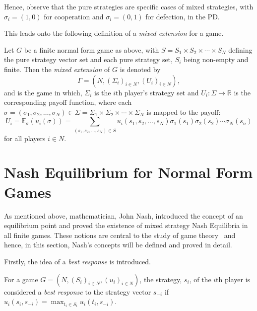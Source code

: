 Hence, observe that the pure
strategies are specific cases of mixed strategies, with \(\sigma_{i} = (1, 0)\)
for cooperation and \(\sigma_{i} = (0, 1)\) for defection, in the PD\@.

This leads onto the following definition of a \textit{mixed extension} for a game.
\begin{definition}
    Let \(G\) be a finite normal form game as above, with \(S = S_{1} \times
S_{2} \times \cdots \times S_{N}\) defining the pure strategy vector set and
each pure strategy set, \(S_{i}\) being non-empty and finite. Then the
\textit{mixed extension} of \(G\) is denoted by
\begin{equation}
    \Gamma = (N, {(\Sigma_{i})}_{i \in N}, {(U_{i})}_{i \in N}), 
\end{equation}
and is the game in which, \(\Sigma_{i}\) is the \(i\)th player's strategy set
and \(U_{i} : \Sigma \to \mathbb{R}\) is the corresponding payoff function,
where each \(\sigma = (\sigma_{1}, \sigma_{2}, \ldots, \sigma_{N}) \in \Sigma =
\Sigma_{1} \times \Sigma_{2} \times \cdots \times \Sigma_{N}\) is mapped to the
payoff:
\begin{equation}
    U_{i} = \mathbb{E}_{\sigma}(u_{i}(\sigma)) = \sum_{(s_{1}, s_{2}, \ldots, s_
    {N}) \in S}{u_{i}(s_{1}, s_{2}, \ldots, s_{N})\sigma_{1}(s_{1})\sigma_{2}(s_
    {2})\cdots\sigma_{N}(s_{n})} 
\end{equation}\label{eqn:mixed_payoff_function}
for all players \(i \in N\).
\end{definition}

\section{Nash Equilibrium for Normal Form Games}\label{sec:NE_for_Normal_Form_Games}
As mentioned above, mathematician, John Nash, introduced the concept of an
equilibrium point and proved the existence of mixed strategy Nash Equilibria in
all finite games. These notions are central to the study of game
theory~\cite{maschler_solan_zamir_2013} and hence, in this section, Nash's
concepts will be defined and proved in detail.

Firstly, the idea of a \textit{best response} is introduced.
\begin{definition}
    For a game \(G=(N, {(S_{i})}_{i \in N}, {(u_{i})}_{i \in N})\), the strategy,
\(s_{i}\), of the \(i\)th player is considered a \textit{best response} to the
strategy vector \(s_{-i}\) if \(u_{i}(s_{i}, s_{-i}) = \max_{t_{i} \in
S_{i}}u_{i}(t_{i}, s_{-i})\).
\end{definition}

